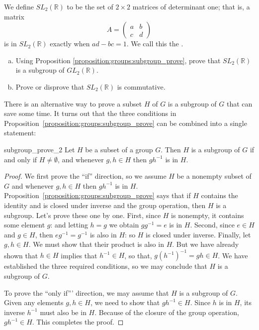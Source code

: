 \begin{exercise}{70}
We define $SL_2( {\mathbb R})$\label{speciallinear} to be the set of $2 \times 2$ matrices of determinant one; that is, a matrix
\[
A =
\begin{pmatrix}
a & b \\
c & d
\end{pmatrix}
\]
is in $SL_2( {\mathbb R})$ exactly when $ad - bc = 1$.  We call this the  \label{speciallinear}.

\begin{enumerate}[(a)]
\item
Using Proposition \ref{proposition:groups:subgroup_prove}, prove that $SL_2( {\mathbb R})$ is a subgroup of $GL_2( {\mathbb R})$.
\item
Prove or disprove that $SL_2( {\mathbb R})$ is commutative.
\end{enumerate}
\end{exercise}

There is an alternative way to prove a subset $H$ of $G$ is a subgroup of $G$ that  can save some time.  It turns out that the three conditions in Proposition~\ref{proposition:groups:subgroup_prove} can be combined into a single statement:

\begin{prop}{subgroup_prove_2}
Let $H$ be a subset of a group $G$.  Then $H$ is a subgroup of $G$ if and only if $H \neq \emptyset$, and whenever $g, h \in H$ then $gh^{-1}$ is in $H$. 
\end{prop}
 
 
\begin{proof}
We first prove the ``if'' direction, so we assume $H$ be a nonempty subset of $G$ and whenever $g, h \in H$ then $gh^{-1}$ is in $H$. Proposition~\ref{proposition:groups:subgroup_prove} says that if $H$ contains the identity and is closed under inverse and the group operation, then $H$ is a subgroup. Let's prove these one by one. First, since $H$ is nonempty, it contains some element $g$: and letting $h=g$ we obtain $gg^{-1} = e$ is in $H$.  Second, since $e \in H$ and  $g \in H$, then $eg^{-1} = g^{-1}$ is also in $H$: so $H$ is closed under inverse.  Finally, let $g, h \in H$. We must show that their product is also in $H$.  But we have already shown that $h \in H$ implies that $h^{-1} \in H$, so that, $g(h^{-1})^{-1} = gh \in H$.  We have established the three required conditions, so we may conclude that  $H$ is a subgroup of $G$.

To prove the ``only  if''' direction, we may assume that $H$ is a subgroup of $G$. Given any elements $g, h \in H$, we need to show that $gh^{-1} \in H$.  Since $h$ is in $H$, its inverse $h^{-1}$ must also be in $H$.  Because of the closure of the group operation, $gh^{-1} \in H$. This completes the proof. 
\end{proof}

